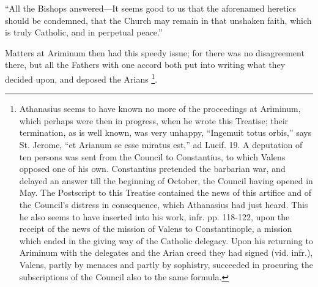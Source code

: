 ``All the Bishops answered—It
seems good to us that the aforenamed heretics should be condemned,
that the Church may remain in that unshaken faith, which is truly
Catholic, and in perpetual peace.''

Matters at Ariminum then had
this speedy issue; for there was no disagreement there, but all the
Fathers with one accord both put into writing what they decided upon,
and deposed the Arians \footnote{Athanasius seems to have known no more of the proceedings at Ariminum,
which perhaps were then in progress, when he wrote this Treatise;
their termination, as is well known, was very unhappy, ``Ingemuit totus
orbis,'' says St. Jerome, ``et Arianum se esse miratus est,'' ad
Lucif. 19. A deputation of ten persons was sent from the Council to
Constantius, to which Valens opposed one of his own. Constantius
pretended the barbarian war, and delayed an answer till the beginning
of October, the Council having opened in May. The Postscript to this
Treatise contained the news of this artifice and of the Council's
distress in consequence, which Athanasius had just heard. This he also
seems to have inserted into his work, infr. pp. 118-122, upon the
receipt of the news of the mission of Valens to Constantinople, a
mission which ended in the giving way of the Catholic delegacy. Upon
his returning to Ariminum with the delegates and the Arian creed they
had signed (vid. infr.), Valens, partly by menaces and partly by
sophistry, succeeded in procuring the subscriptions of the Council
also to the same formula.}.

